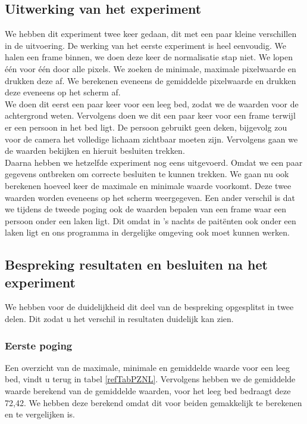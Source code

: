  \subsection{Uitwerking van het experiment}
 \label{ERefPZNV}
 We hebben dit experiment twee keer gedaan, dit met een paar kleine verschillen in de uitvoering.
 De werking van het eerste experiment is heel eenvoudig. We halen een frame binnen, we doen deze keer de normalisatie stap niet. We lopen \'e\'en voor \'e\'en door alle pixels. We zoeken de minimale, maximale pixelwaarde en drukken deze af. We berekenen eveneens de gemiddelde pixelwaarde en drukken deze eveneens op het scherm af. \\
 We doen dit eerst een paar keer voor een leeg bed, zodat we de waarden voor de achtergrond weten. Vervolgens doen we dit een paar keer voor een frame terwijl er een persoon in het bed ligt. De persoon gebruikt geen deken, bijgevolg zou voor de camera het volledige lichaam zichtbaar moeten zijn.  Vervolgens gaan we de waarden bekijken en hieruit besluiten trekken. \\
 Daarna hebben we hetzelfde experiment nog eens uitgevoerd. Omdat we een paar gegevens ontbreken om correcte besluiten te kunnen trekken. We gaan nu ook berekenen hoeveel keer de maximale en minimale waarde voorkomt. Deze twee waarden worden eveneens op het scherm weergegeven. Een ander verschil is dat we tijdens de tweede poging ook de waarden bepalen van een frame waar een persoon onder een laken ligt. Dit omdat in 's nachts de pait\"enten ook onder een laken ligt en ons programma in dergelijke omgeving ook moet kunnen werken. 
 
 
 \subsection{Bespreking resultaten en besluiten na het experiment}
 \label{ERefPZNB}
 We hebben voor de duidelijkheid dit deel van de bespreking opgesplitst in twee delen. Dit zodat u het verschil in resultaten duidelijk kan zien. 
 
\subsubsection{Eerste poging} 
Een overzicht van de maximale, minimale en gemiddelde waarde voor een leeg bed, vindt u terug in tabel \ref{refTabPZNL}. Vervolgens hebben we de gemiddelde waarde berekend van de gemiddelde waarden, voor het leeg bed bedraagt deze 72,42. We hebben deze berekend omdat dit voor beiden gemakkelijk te berekenen en te vergelijken is. 

